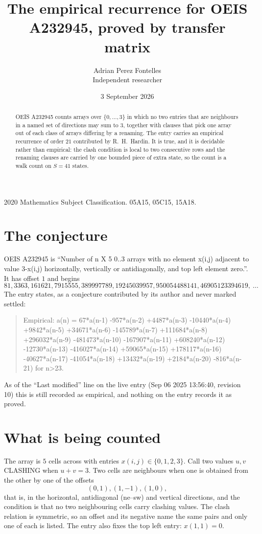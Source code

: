 \documentclass[11pt,a4paper]{article}
\title{The empirical recurrence for OEIS A232945, proved by transfer matrix}
\author{Adrian Perez Fontelles\\ \small Independent researcher}
\date{3 September 2026}
\theoremstyle{plain}
\theoremstyle{definition}
\begin{document}
\maketitle

\begin{abstract}
OEIS A232945 counts arrays over $\{0,\dots,3\}$ in which no two entries that are neighbours in
a named set of directions may sum to $3$, together with clauses that pick one array out of
each class of arrays differing by a renaming. The entry carries an empirical recurrence of
order $21$ contributed by R.~H.~Hardin. It is true, and it is decidable rather than
empirical: the clash condition is local to two consecutive rows and the renaming clauses are
carried by one bounded piece of extra state, so the count is a walk count on $S=41$ states.
\end{abstract}

\noindent\small 2020 Mathematics Subject Classification. 05A15, 05C15, 15A18.\normalsize

\section{The conjecture}

OEIS A232945 is ``Number of n X 5 0..3 arrays with no element x(i,j) adjacent to value 3-x(i,j) horizontally, vertically or antidiagonally, and top left element zero.''. It has offset $1$ and begins
\[
81, 3363, 161621, 7915555, 389997789, 19245039957, 950054488141, 46905123394619,\ \dots
\]
The entry states, as a conjecture contributed by its author and never marked settled:
\begin{quote}
Empirical: a(n) = 67*a(n-1) -957*a(n-2) +4487*a(n-3) -10440*a(n-4) +9842*a(n-5) +34671*a(n-6) -145789*a(n-7) +111684*a(n-8) +296032*a(n-9) -481473*a(n-10) -167907*a(n-11) +608240*a(n-12) -12730*a(n-13) -416027*a(n-14) +59065*a(n-15) +178117*a(n-16) -40627*a(n-17) -41054*a(n-18) +13432*a(n-19) +2184*a(n-20) -816*a(n-21) for n>23.
\end{quote}
As of the ``Last modified'' line on the live entry (Sep 06 2025 13:56:40, revision 10) this is still
recorded as empirical, and nothing on the entry records it as proved.

\section{What is being counted}

The array is $5$ cells across with entries $x(i,j)\in\{0,1,2,3\}$. Call two values $u,v$ CLASHING
when $u+v=3$. Two cells are neighbours when one is obtained from the other by one of
the offsets
\[
(0,1), (1,-1), (1,0),
\]
that is, in the horizontal, antidiagonal (ne--sw) and vertical directions, and the condition is that no two neighbouring cells carry
clashing values. The clash relation is symmetric, so an offset and its negative name the
same pairs and only one of each is listed. The entry also fixes the top left entry: $x(1,1)=0$.
\end{document}
